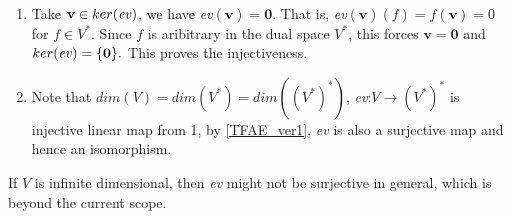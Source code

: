 \begin{pfbox}
\begin{enumerate}
    \item Take $\mathbf{v}\in ker(\text{\emph{ev}})$, we have \emph{ev}$(\mathbf{v})=\mathbf{0}.$
    That is, \emph{ev}$(\mathbf{v})(f)=f(\mathbf{v})=0$ for $f\in V^*$.
    Since $f$ is aribitrary in the dual space $V^*$, this forces $\mathbf{v}=\mathbf{0}$ and $ker(\text{\emph{ev}})=\{\mathbf{0}\}.$
    This proves the injectiveness.
    \item Note that $dim(V)=dim(V^*)=dim((V^*)^*)$, \emph{ev}:$V\to (V^*)^*$ is injective linear map from 1,
    by \eqref{TFAE_ver1}, \emph{ev} is also a surjective map and hence an isomorphism.  
\end{enumerate}
\end{pfbox}

\begin{remark}
    If $V$ is infinite dimensional, then \emph{ev} might not be surjective in general, which is beyond the current scope.
\end{remark}